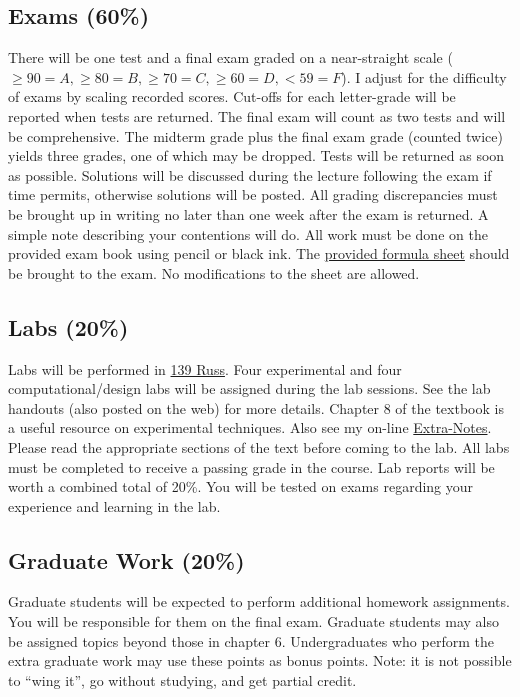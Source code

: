 \documentclass[10pt]{article}
\begin{document}
\subsection{Exams (60\%)}
There will be one test and a final exam graded on a near-straight scale ($\geq 90 = A,\geq 80 = B, \geq 70 = C, \geq 60 = D, < 59 = F$).  I  adjust for the difficulty of exams by scaling recorded scores. Cut-offs for each letter-grade will be reported when tests are returned.  The final exam will count as two tests and will be comprehensive.  The midterm grade plus the final exam grade (counted twice) yields three grades, one of which may be dropped.  Tests will be returned as soon as possible.  Solutions will be discussed during the lecture following the exam if time permits, otherwise solutions will be posted.  All grading discrepancies must be brought up in writing no later than one week after the exam is returned.  A simple note describing your contentions will do.  All work must be done on the provided exam book using pencil or black ink. The \href{http://www.cs.wright.edu/~jslater/materials/formulasheet.pdf}{provided formula sheet} should be brought to the exam. No modifications to the sheet are allowed. 

\subsection{Labs (20\%)}\label{sec:labs}
Labs will be performed in  \href{http://www.cs.wright.edu/~jslater/viblab/viblab.html}{139 Russ}. Four experimental and four computational/design labs will be assigned during the lab sessions.  See the lab handouts (also posted on the web) for more details.  Chapter 8 of the textbook is a useful resource on experimental techniques. Also see my on-line \href{http://www.cs.wright.edu/~jslater/materials/Complex_Solution.pdf}{Extra-Notes}. Please read the appropriate sections of the text before coming to the lab.  All labs must be completed to receive a passing grade in the course.  Lab reports will be worth a combined total of 20\%.  You will be tested on exams regarding your experience and learning in the lab.

\subsection{Graduate Work (20\%)} Graduate students will be expected to perform additional homework assignments.  You will be responsible for them on the final exam.  Graduate students may also be assigned  topics beyond those in chapter 6.  Undergraduates who perform the extra graduate work may use these points as bonus points.  Note: it is not possible to ``wing it'', go without studying, and get partial credit.
\end{document}
